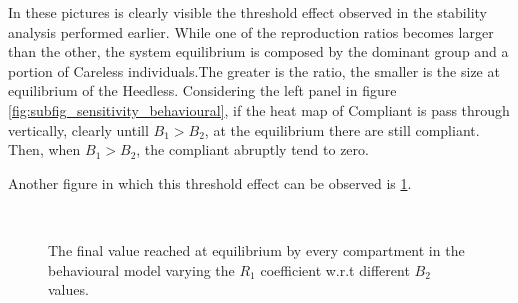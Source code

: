 In these pictures is clearly visible the threshold effect observed in the stability analysis performed earlier. While one of the reproduction ratios becomes larger than the other, the system equilibrium is composed by the dominant group and a portion of Careless individuals.The greater is the ratio, the  smaller is the size at equilibrium of the Heedless. Considering the left panel in figure \ref{fig:subfig_sensitivity_behavioural}, if the heat map of Compliant is pass through vertically, clearly untill $B_1 > B_2$, at the equilibrium there are still compliant. Then, when $B_1 > B_2$, the compliant abruptly tend to zero. 

Another figure in which this threshold effect can be observed is \ref{fig:subfig_sensitivity_behavioural_r1}.

\begin{figure}[h]
	\centering
	 \quad
	 \\
	\caption[Final Behavioural compartments varying $B_1$]{The final value reached at equilibrium by every compartment in the behavioural model varying the $R_1$ coefficient w.r.t different $B_2$ values.}
	\label{fig:subfig_sensitivity_behavioural_r1}
\end{figure}
